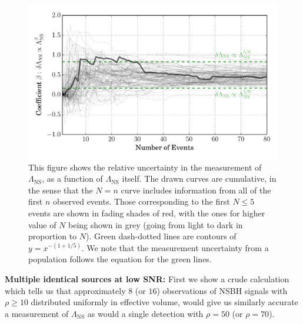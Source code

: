 \documentclass[aps,prd,amsmath,floats,floatfix, twocolumn,
superscriptaddress,nofootinbib,showpacs]{revtex4-1}
\newcommand{\prayush}{\textcolor{red!40!black}}
\newcommand{\lambdans}{\Lambda_\mathrm{NS}}
\begin{document}
%
% 
\begin{figure}
\centering    
\includegraphics[width=\columnwidth]{plots/PowerLawCoefficient_LambdaErrorvsLambda_vs_N_AllPopulations.pdf}
\caption{This figure shows the relative uncertainty in the measurement of $\lambdans$,
as a function of $\lambdans$ itself. The drawn curves are cumulative, in the sense 
that the $N=n$ curve includes information from all of the first $n$ observed events.
Those corresponding to the first $N\leq 5$ events are shown in fading shades of red,
with the ones for higher value of $N$ being shown in grey (going from light to dark in
proportion to $N$).
Green dash-dotted lines are contours of $y=x^{-(1+1/5)}$.
% 
\prayush{We note that the measurement uncertainty from a population follows the
equation for the green lines.}
% 
}
\label{fig:TT_Lambda_vs_Lambda_L500_2000_CI90_0_AllInOne}
\end{figure}



\textbf{Multiple identical sources at low SNR: }\label{s2:identical_multiple}
% 
First we show a crude calculation which tells us that approximately $8$ (or $16$) 
observations
of NSBH signals with $\rho\geq 10$ distributed uniformly in effective volume, would
give us similarly accurate a measurement of $\lambdans$ as would a single detection
with $\rho=50$ (or $\rho=70$). 
\end{document}
